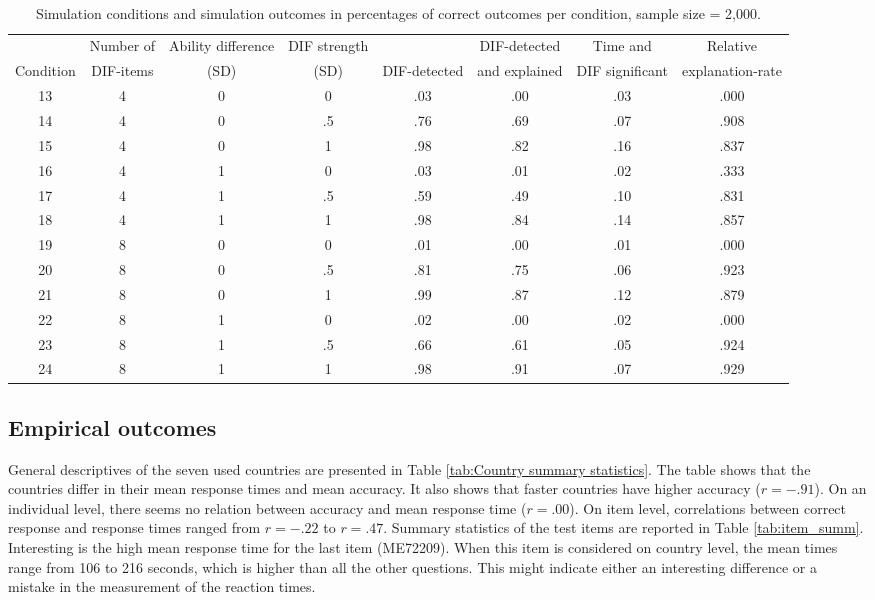 \documentclass{interact}
\begin{document}
\begin{landscape}

\pagestyle{empty}
\begin{table}[p]

\caption{\label{tab:sim_2000}\\ Simulation conditions and simulation outcomes in percentages of correct outcomes per condition, sample size = 2,000.}
\begin{tabular}{c| c c c | c c c c}
\hline
\hline
     & Number of & Ability difference & DIF strength &  & DIF-detected & Time and & Relative\\
    Condition & DIF-items & (SD) & (SD) & DIF-detected & and explained & DIF significant & explanation-rate\\
    \hline
    13 & 4 & 0 & 0 & .03 & .00 & .03 & .000 \\
    14 & 4 & 0 & .5 & .76 & .69 & .07 & .908 \\
    15 & 4 & 0 & 1 & .98 & .82 & .16 & .837 \\
    16 & 4 & 1 & 0 & .03 & .01 & .02 & .333 \\
    17 & 4 & 1 & .5 & .59 & .49 & .10 & .831\\
    18 & 4 & 1 & 1 & .98 & .84 & .14 & .857 \\
    19 & 8 & 0 & 0 & .01 & .00 & .01 & .000 \\
    20 & 8 & 0 & .5 & .81 & .75 & .06 & .923 \\
    21 & 8 & 0 & 1 & .99 & .87 & .12 & .879 \\
    22 & 8 & 1 & 0 & .02 & .00 & .02 & .000\\
    23 & 8 & 1 & .5 & .66 & .61 & .05 & .924 \\
    24 & 8 & 1 & 1 & .98 & .91 & .07 & .929 \\
    \hline
    \hline
\end{tabular}

\end{table}


\end{landscape}
\pagestyle{plain}

\subsection{Empirical outcomes}
General descriptives of the seven used countries are presented in Table \ref{tab:Country summary statistics}. The table shows that the countries differ in their mean response times and mean accuracy. It also shows that faster countries have higher accuracy ($r = -.91$). On an individual level, there seems no relation between accuracy and mean response time ($r = .00$). On item level, correlations between correct response and response times ranged from $r = -.22$ to $r = .47$. Summary statistics of the test items are reported in Table \ref{tab:item_summ}. Interesting is the high mean response time for the last item (ME72209). When this item is considered on country level, the mean times range from 106 to 216 seconds, which is higher than all the other questions. This might indicate either an interesting difference or a mistake in the measurement of the reaction times. 
\end{document}
